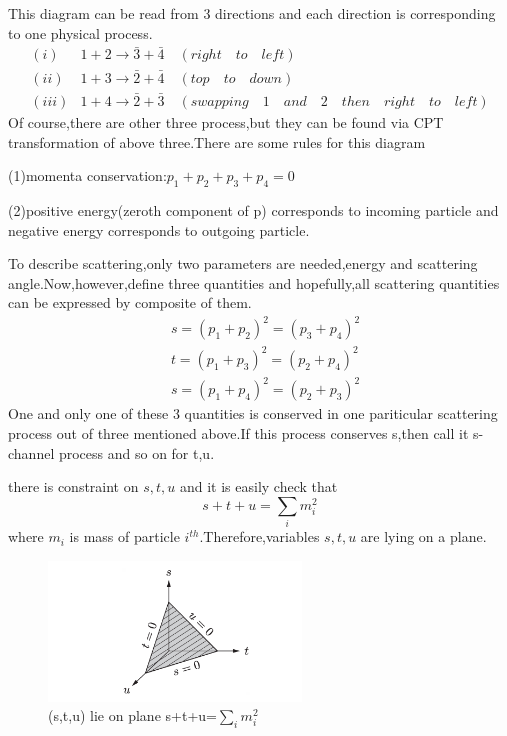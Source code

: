 \documentclass[a4paper]{article}
\begin{document}
This diagram can be read from 3 directions and each direction is corresponding to one physical process.
\begin{align*}
	(i)&1+2\rightarrow\bar{3}+\bar{4}\quad(right\quad to\quad left)\\
	(ii)&1+3\rightarrow\bar{2}+\bar{4}\quad(top\quad to\quad down)\\
	(iii)&1+4\rightarrow\bar{2}+\bar{3}\quad(swapping\quad1\quad and\quad2\quad then\quad right\quad to\quad left)
\end{align*}
Of course,there are other three process,but they can be found via CPT transformation of above three.There are some rules for this diagram
\par (1)momenta conservation:$p_1+p_2+p_3+p_4=0$
\par (2)positive energy(zeroth component of p) corresponds to incoming particle and negative energy corresponds to outgoing particle.
\par To describe scattering,only two parameters are needed,energy and scattering angle.Now,however,define three quantities and hopefully,all scattering quantities can be expressed by composite of them.
\begin{align*}
	&s=(p_1+p_2)^2=(p_3+p_4)^2\\
	&t=(p_1+p_3)^2=(p_2+p_4)^2\\
	&s=(p_1+p_4)^2=(p_2+p_3)^2
\end{align*}
One and only one of these 3 quantities is conserved in one pariticular scattering process out of three mentioned above.If this process conserves s,then call it s-channel process and so on for t,u.
\par there is constraint on $s,t,u$ and it is easily check that$$s+t+u=\sum_im_i^2$$where $m_i$ is mass of particle $i^{th}$.Therefore,variables $s,t,u$ are lying on a plane.
\begin{figure}[htbp]
	\centering
	\includegraphics[width=0.6\textwidth]{12.png}
	\caption{(s,t,u) lie on plane s+t+u=$\sum_im_i^2$}
\end{figure}
\end{document}
